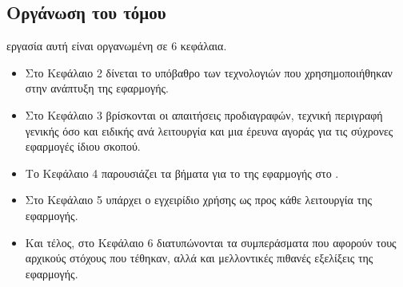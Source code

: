 \subsection*{Οργάνωση του τόμου}
 εργασία αυτή είναι οργανωμένη σε 6 κεφάλαια.
\begin{itemize}
    \item Στο Κεφάλαιο 2 δίνεται το υπόβαθρο των τεχνολογιών που χρησημοποιήθηκαν στην ανάπτυξη της εφαρμογής.
    \item Στο Κεφάλαιο 3 βρίσκονται οι απαιτήσεις προδιαγραφών, τεχνική περιγραφή γενικής όσο και ειδικής ανά λειτουργία και μια έρευνα αγοράς για τις σύχρονες εφαρμογές ίδιου σκοπού.
    \item Το Κεφάλαιο 4 παρουσιάζει τα βήματα για το  της εφαρμογής στο .
    \item Στο Κεφάλαιο 5 υπάρχει ο εγχειρίδιο χρήσης ως προς κάθε λειτουργία της εφαρμογής.
    \item Και τέλος, στο Κεφάλαιο 6 διατυπώνονται τα συμπεράσματα που αφορούν τους αρχικούς στόχους που τέθηκαν, αλλά και μελλοντικές πιθανές εξελίξεις της εφαρμογής.
\end{itemize}